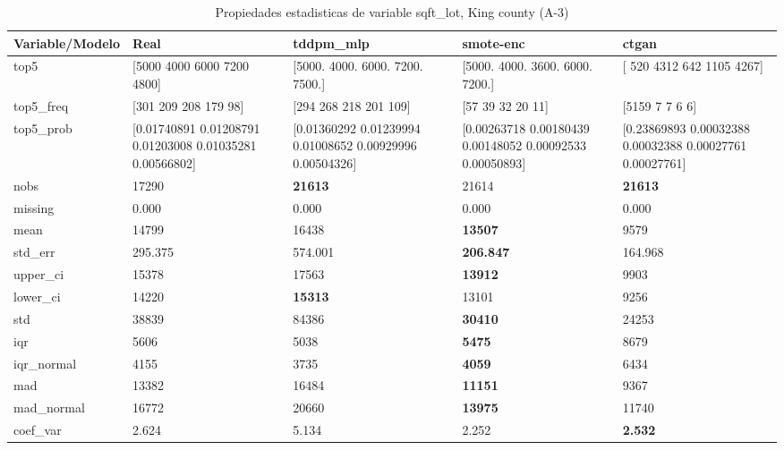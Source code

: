 \begin{table}[H]
\centering
\fontsize{8}{14}\selectfont
\caption{Propiedades  estadisticas de variable sqft\_lot, King county (A-3)}
\label{table-stats-king county-a-3-sqft_lot}
\begin{tabular}{|l|m{10em}|m{10em}|m{10em}|m{10em}|}
\hline
 \rowcolor[gray]{0.8}
Variable/Modelo & Real & tddpm\_mlp & smote-enc & ctgan \\
\hline top5 & [5000 4000 6000 7200 4800] & [5000. 4000. 6000. 7200. 7500.] & [5000. 4000. 3600. 6000. 7200.] & [ 520 4312  642 1105 4267] \\
\hline top5\_freq & [301 209 208 179  98] & [294 268 218 201 109] & [57 39 32 20 11] & [5159    7    7    6    6] \\
\hline top5\_prob & [0.01740891 0.01208791 0.01203008 0.01035281 0.00566802] & [0.01360292 0.01239994 0.01008652 0.00929996 0.00504326] & [0.00263718 0.00180439 0.00148052 0.00092533 0.00050893] & [0.23869893 0.00032388 0.00032388 0.00027761 0.00027761] \\
\hline nobs & 17290 & \bfseries 21613 & \cellcolor[rgb]{0.9, 0.54, 0.52} 21614 & \bfseries 21613 \\
\hline missing & 0.000 & 0.000 & 0.000 & 0.000 \\
\hline mean & 14799 & 16438 & \bfseries 13507 & \cellcolor[rgb]{0.9, 0.54, 0.52} 9579 \\
\hline std\_err & 295.375 & \cellcolor[rgb]{0.9, 0.54, 0.52} 574.001 & \bfseries 206.847 & 164.968 \\
\hline upper\_ci & 15378 & 17563 & \bfseries 13912 & \cellcolor[rgb]{0.9, 0.54, 0.52} 9903 \\
\hline lower\_ci & 14220 & \bfseries 15313 & 13101 & \cellcolor[rgb]{0.9, 0.54, 0.52} 9256 \\
\hline std & 38839 & \cellcolor[rgb]{0.9, 0.54, 0.52} 84386 & \bfseries 30410 & 24253 \\
\hline iqr & 5606 & 5038 & \bfseries 5475 & \cellcolor[rgb]{0.9, 0.54, 0.52} 8679 \\
\hline iqr\_normal & 4155 & 3735 & \bfseries 4059 & \cellcolor[rgb]{0.9, 0.54, 0.52} 6434 \\
\hline mad & 13382 & 16484 & \bfseries 11151 & \cellcolor[rgb]{0.9, 0.54, 0.52} 9367 \\
\hline mad\_normal & 16772 & 20660 & \bfseries 13975 & \cellcolor[rgb]{0.9, 0.54, 0.52} 11740 \\
\hline coef\_var & 2.624 & \cellcolor[rgb]{0.9, 0.54, 0.52} 5.134 & 2.252 & \bfseries 2.532 \\

\end{tabular}
\end{table}
